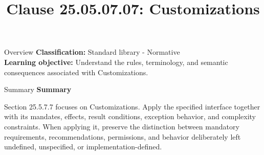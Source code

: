 \documentclass[10pt,letterpaper]{article}
\title{Clause 25.05.07.07: Customizations}
\author{}
\date{}
\begin{document}
\maketitle
\begin{CornellOverviewBox}{Overview}
\textbf{Classification:} Standard library - Normative\\[2pt]
\textbf{Learning objective:} Understand the rules, terminology, and semantic consequences associated with Customizations.
\end{CornellOverviewBox}\begin{CornellSummaryBox}{Summary}
{\sffamily\bfseries\color{Accent} Summary}\par\vspace{3pt}Section 25.5.7.7 focuses on Customizations. Apply the specified interface together with its mandates, effects, result conditions, exception behavior, and complexity constraints. When applying it, preserve the distinction between mandatory requirements, recommendations, permissions, and behavior deliberately left undefined, unspecified, or implementation-defined.
\end{CornellSummaryBox}
\end{document}
